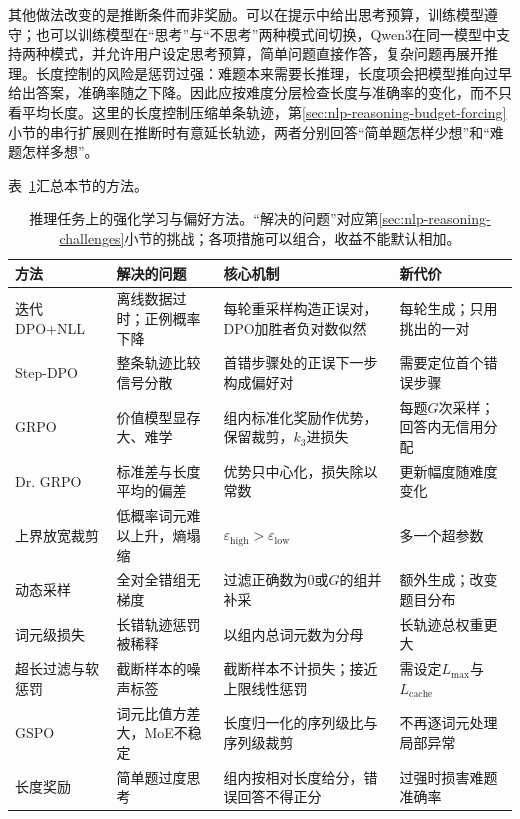 其他做法改变的是推断条件而非奖励。可以在提示中给出思考预算，训练模型遵守；也可以训练模型在“思考”与“不思考”两种模式间切换，Qwen3在同一模型中支持两种模式，并允许用户设定思考预算，简单问题直接作答，复杂问题再展开推理。长度控制的风险是惩罚过强：难题本来需要长推理，长度项会把模型推向过早给出答案，准确率随之下降。因此应按难度分层检查长度与准确率的变化，而不只看平均长度。这里的长度控制压缩单条轨迹，第\ref{sec:nlp-reasoning-budget-forcing}小节的串行扩展则在推断时有意延长轨迹，两者分别回答“简单题怎样少想”和“难题怎样多想”。

表~\ref{tab:nlp-reasoning-rl-variants}汇总本节的方法。

\begin{table}[htbp]
  \centering
  \small
  \caption{推理任务上的强化学习与偏好方法。“解决的问题”对应第\ref{sec:nlp-reasoning-challenges}小节的挑战；各项措施可以组合，收益不能默认相加。}
  \label{tab:nlp-reasoning-rl-variants}
  \begin{tabularx}{\linewidth}{@{}p{24mm}p{32mm}Xp{36mm}@{}}
    \toprule
    方法 & 解决的问题 & 核心机制 & 新代价\\
    \midrule
    迭代DPO+NLL & 离线数据过时；正例概率下降 & 每轮重采样构造正误对，DPO加胜者负对数似然 & 每轮生成；只用挑出的一对\\
    Step-DPO & 整条轨迹比较信号分散 & 首错步骤处的正误下一步构成偏好对 & 需要定位首个错误步骤\\
    GRPO & 价值模型显存大、难学 & 组内标准化奖励作优势，保留裁剪，$k_3$进损失 & 每题$G$次采样；回答内无信用分配\\
    Dr. GRPO & 标准差与长度平均的偏差 & 优势只中心化，损失除以常数 & 更新幅度随难度变化\\
    上界放宽裁剪 & 低概率词元难以上升，熵塌缩 & $\varepsilon_{\mathrm{high}}>\varepsilon_{\mathrm{low}}$ & 多一个超参数\\
    动态采样 & 全对全错组无梯度 & 过滤正确数为0或$G$的组并补采 & 额外生成；改变题目分布\\
    词元级损失 & 长错轨迹惩罚被稀释 & 以组内总词元数为分母 & 长轨迹总权重更大\\
    超长过滤与软惩罚 & 截断样本的噪声标签 & 截断样本不计损失；接近上限线性惩罚 & 需设定$L_{\max}$与$L_{\mathrm{cache}}$\\
    GSPO & 词元比值方差大，MoE不稳定 & 长度归一化的序列级比与序列级裁剪 & 不再逐词元处理局部异常\\
    长度奖励 & 简单题过度思考 & 组内按相对长度给分，错误回答不得正分 & 过强时损害难题准确率\\
    \bottomrule
  \end{tabularx}
\end{table}

